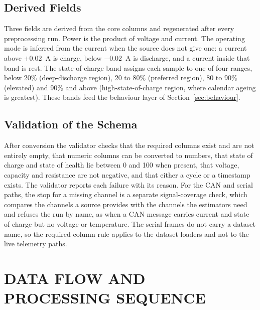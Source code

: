 \documentclass[12pt,a4paper]{amritareport}
\begin{document}
\subsection{Derived Fields}

Three fields are derived from the core columns and regenerated after every preprocessing run. Power is the product of voltage and current. The operating mode is inferred from the current when the source does not give one: a current above $+0.02$~A is charge, below $-0.02$~A is discharge, and a current inside that band is rest. The state-of-charge band assigns each sample to one of four ranges, below 20\% (deep-discharge region), 20 to 80\% (preferred region), 80 to 90\% (elevated) and 90\% and above (high-state-of-charge region, where calendar ageing is greatest). These bands feed the behaviour layer of Section~\ref{sec:behaviour}.

\subsection{Validation of the Schema}

After conversion the validator checks that the required columns exist and are not entirely empty, that numeric columns can be converted to numbers, that state of charge and state of health lie between 0 and 100 when present, that voltage, capacity and resistance are not negative, and that either a cycle or a timestamp exists. The validator reports each failure with its reason. For the CAN and serial paths, the stop for a missing channel is a separate signal-coverage check, which compares the channels a source provides with the channels the estimators need and refuses the run by name, as when a CAN message carries current and state of charge but no voltage or temperature. The serial frames do not carry a dataset name, so the required-column rule applies to the dataset loaders and not to the live telemetry paths.

\section{DATA FLOW AND PROCESSING SEQUENCE}
\end{document}
